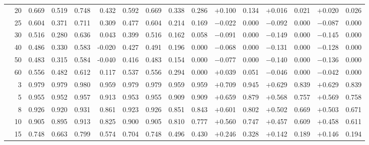 \documentclass[conference]{IEEEtran}
\theoremstyle{remark}
\begin{document}
\begin{table}[t]
{\begin{tabular}{p{2.2cm}r rrrr rr rr rr rr rr}
  & 20 & 0.669 & 0.519 & 0.748 & 0.432 & 0.592 & 0.669 & 0.338 & 0.286 & $+$0.100 & 0.134 & $+$0.016 & 0.021 & $+$0.020 & 0.026 \\
  & 25 & 0.604 & 0.371 & 0.711 & 0.309 & 0.477 & 0.604 & 0.214 & 0.169 & $-$0.022 & 0.000 & $-$0.092 & 0.000 & $-$0.087 & 0.000 \\
  & 30 & 0.516 & 0.280 & 0.636 & 0.043 & 0.399 & 0.516 & 0.162 & 0.058 & $-$0.091 & 0.000 & $-$0.149 & 0.000 & $-$0.145 & 0.000 \\
  & 40 & 0.486 & 0.330 & 0.583 & -0.020 & 0.427 & 0.491 & 0.196 & 0.000 & $-$0.068 & 0.000 & $-$0.131 & 0.000 & $-$0.128 & 0.000 \\
  & 50 & 0.483 & 0.315 & 0.584 & -0.040 & 0.416 & 0.483 & 0.154 & 0.000 & $-$0.077 & 0.000 & $-$0.140 & 0.000 & $-$0.136 & 0.000 \\
  & 60 & 0.556 & 0.482 & 0.612 & 0.117 & 0.537 & 0.556 & 0.294 & 0.000 & $+$0.039 & 0.051 & $-$0.046 & 0.000 & $-$0.042 & 0.000 \\
\midrule
{}
  & 3  & 0.979 & 0.979 & 0.980 & 0.959 & 0.979 & 0.979 & 0.959 & 0.959 & $+$0.709 & 0.945 & $+$0.629 & 0.839 & $+$0.629 & 0.839 \\
  & 5  & 0.955 & 0.952 & 0.957 & 0.913 & 0.953 & 0.955 & 0.909 & 0.909 & $+$0.659 & 0.879 & $+$0.568 & 0.757 & $+$0.569 & 0.758 \\
  & 8  & 0.926 & 0.920 & 0.931 & 0.861 & 0.923 & 0.926 & 0.851 & 0.843 & $+$0.601 & 0.802 & $+$0.502 & 0.669 & $+$0.503 & 0.671 \\
  & 10 & 0.905 & 0.895 & 0.913 & 0.825 & 0.900 & 0.905 & 0.810 & 0.777 & $+$0.560 & 0.747 & $+$0.457 & 0.609 & $+$0.458 & 0.611 \\
  & 15 & 0.748 & 0.663 & 0.799 & 0.574 & 0.704 & 0.748 & 0.496 & 0.430 & $+$0.246 & 0.328 & $+$0.142 & 0.189 & $+$0.146 & 0.194 \\

\end{tabular}}
\end{table}
\end{document}
